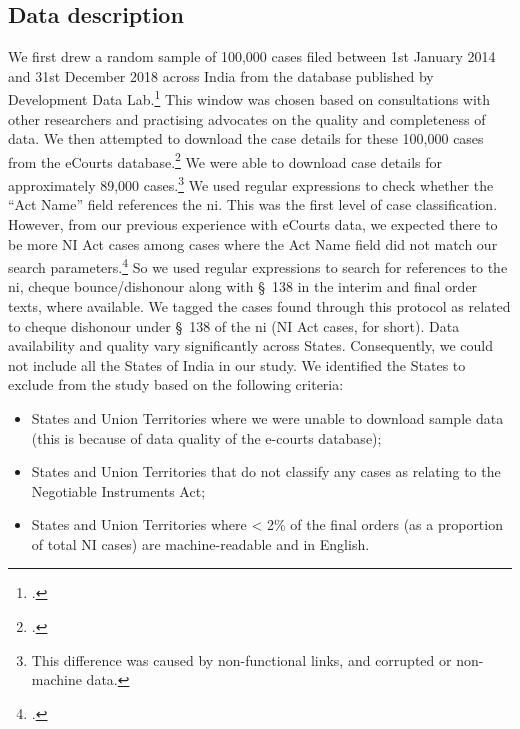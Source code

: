 \subsection{Data description} \label{sec:data-description}

We first drew a random sample of 100,000 cases filed between 1st January 2014 and 31st December 2018 across India from the database published by Development Data Lab.\footcite{devdatalabs2021_eCourtsData} This window was chosen based on consultations with other researchers and practising advocates on the quality and completeness of data. We then attempted to download the case details for these 100,000 cases from the eCourts database.\footcite{ecourts2022} We were able to download case details for approximately 89,000 cases.\footnote{This difference was caused by non-functional links, and corrupted or non-machine data.} We used regular expressions to check whether the ``Act Name'' field references the \gls{ni}. This was the first level of case classification. However, from our previous experience with eCourts data, we expected there to be more NI Act cases among cases where the Act Name field did not match our search parameters.\footcite[The Act Name field sometimes does not contain the name of the substantive act, but rather the name of procedural act (e.g.: CrPC) or in rare cases the subject matter of the case. This is mainly due to the fact that case classification and nomenclature practices vary from state-to-state. However, in rare cases, the field is not populated at all, or contains erroneous information. For details please see ][]{damle2020_ecourtsData} So we used regular expressions to search for references to the \gls{ni}, cheque bounce/dishonour along with \S~138 in the interim and final order texts, where available. We tagged the cases found through this protocol as related to cheque dishonour under \S~138 of the \gls{ni} (NI Act cases, for short). Data availability and quality vary significantly across States. Consequently, we could not include all the States of India in our study. We identified the States to exclude from the study based on the following criteria:

\begin{itemize}
\item States and Union Territories where we were unable to download sample data (this is because of data quality of the e-courts database);
\item States and Union Territories that do not classify any cases as relating to the Negotiable Instruments Act;
\item States and Union Territories where < 2\% of the final orders (as a proportion of total NI cases) are machine-readable and in English.
\end{itemize}

